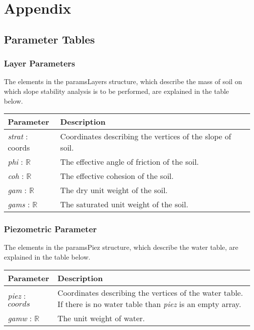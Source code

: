 \documentclass[12pt, titlepage]{article}
\begin{document}
\section{Appendix}

\subsection{Parameter Tables} \label{sec:ParamTables}

\subsubsection{Layer Parameters} \label{Tbl:LayerParam}
\noindent
The elements in the paramsLayers structure, which describe the mass of soil on 
which slope stability analysis is to be performed, are explained in the table 
below.

\begin{center}
\begin{longtable}{ p{}
    p{}}\hline

  \textbf{Parameter} & \textbf{Description}\\ \hline

  \textit{strat} : coords
  & Coordinates describing the vertices of the slope of soil.\\

  \textit{phi} : $\mathbb{R}$ & The
  effective angle of friction of the soil.\\

  \textit{coh} : $\mathbb{R}$ & The
  effective cohesion of the soil.\\

  \textit{gam} : $\mathbb{R}$ & The dry
  unit weight of the soil.\\

  \textit{gams} : $\mathbb{R}$ & The
  saturated unit weight of the soil. \\ \hline
\end{longtable}
\end{center}

\subsubsection{Piezometric Parameter} \label{Tbl:PiezParam}
\noindent
The elements in the paramsPiez structure, which describe the water table, are 
explained in the table below.

\begin{center}
\begin{longtable}{ p{}
    p{}}\hline 
  \textbf{Parameter} & \textbf{Description}\\ \hline

  \textit{piez} : $coords$ & Coordinates describing the vertices of the water 
  table. If there is no water table than \textit{piez} is an empty array. \\

  \textit{gamw} : $\mathbb{R}$ & The unit weight of water. \\ \hline
\end{longtable}
\end{center}
\end{document}
